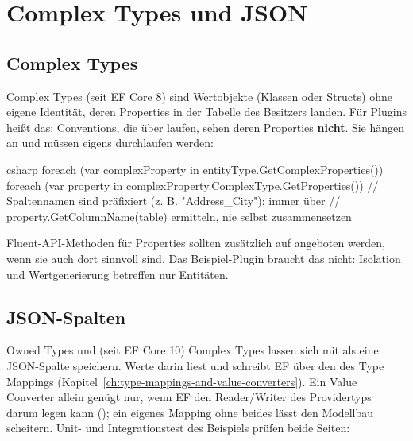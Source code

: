 \chapter{Complex Types und JSON}\label{ch:complex-types-and-json}

\section{Complex Types}

Complex Types (seit EF Core 8) sind Wertobjekte (Klassen oder Structs) ohne eigene Identität, deren Properties in der
Tabelle des Besitzers landen. Für Plugins heißt das: Conventions, die über
laufen, sehen deren Properties \textbf{nicht}. Sie hängen an
 und müssen eigens durchlaufen werden:

\begin{sourcecode}{csharp}
foreach (var complexProperty in entityType.GetComplexProperties())
{
    foreach (var property in complexProperty.ComplexType.GetProperties())
    {
        // Spaltennamen sind präfixiert (z. B. "Address_City"); immer über
        // property.GetColumnName(table) ermitteln, nie selbst zusammensetzen
    }
}
\end{sourcecode}

Fluent-API-Methoden für Properties sollten zusätzlich auf
 angeboten werden,
wenn sie auch dort sinnvoll sind. Das Beispiel-Plugin braucht das nicht: Isolation und
Wertgenerierung betreffen nur Entitäten.

\section{JSON-Spalten}

Owned Types und (seit EF Core 10) Complex Types lassen sich mit
 als eine JSON-Spalte speichern. Werte darin liest
und schreibt EF über den
 des Type Mappings
(Kapitel~\ref{ch:type-mappings-and-value-converters}). Ein Value Converter allein genügt nur,
wenn EF den Reader/Writer des Providertyps darum legen kann
();
ein eigenes Mapping ohne beides lässt den Modellbau scheitern.
Unit- und Integrationstest des Beispiels prüfen beide Seiten:

